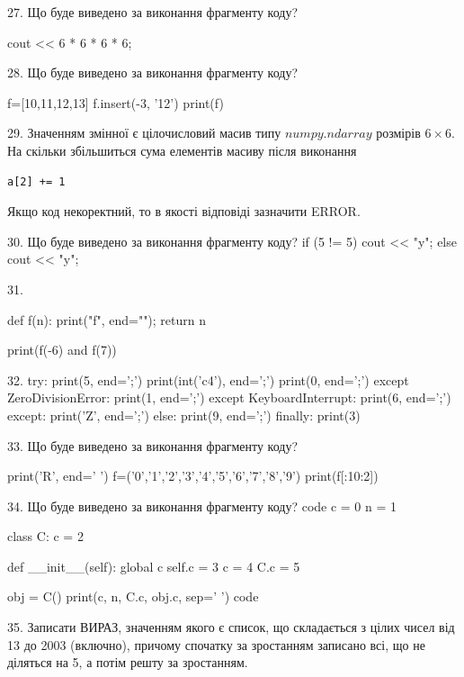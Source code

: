 \documentclass[11pt]{article}
\begin{document}
27. Що буде виведено за виконання фрагменту коду?

cout << 6 * 6 * 6 * 6;


28. Що буде виведено за виконання фрагменту коду?

f=[10,11,12,13]
f.insert(-3, '12')
print(f)



29. 
Значенням змінної  є цілочисловий масив типу $numpy.ndarray$ розмірів $6{\times}6$. На скільки збільшиться сума елементів масиву  після виконання
\begin{verbatim}
a[2] += 1
\end{verbatim}


Якщо код некоректний, то в якості відповіді зазначити ERROR.




30. Що буде виведено за виконання фрагменту коду?
if (5 != 5)
    cout << "y";
else
    cout << "y";



31. 

def f(n):
    print("f", end="");
    return n

print(f(-6) and f(7))


32. 
try:
    print(5, end=';')
    print(int('c4'), end=';')
    print(0, end=';')
except ZeroDivisionError:
    print(1, end=';')
except KeyboardInterrupt:
    print(6, end=';')
except:
    print('Z', end=';')
else:
    print(9, end=';')
finally:
    print(3)


33. Що буде виведено за виконання фрагменту коду?

print('R', end=' ')
f=('0','1','2','3','4','5','6','7','8','9')
print(f[:10:2])



34. Що буде виведено за виконання фрагменту коду?
code
c = 0
n = 1

class C:
    c = 2
    
    def __init__(self):
global c        self.c = 3
        c = 4
        C.c = 5

obj = C()
print(c, n, C.c, obj.c, sep=' ')
code


35. 
Записати ВИРАЗ, значенням якого є список, що складається з цілих чисел від 13 до 2003 (включно), причому спочатку за зростанням записано всі, що не діляться на 5, а потім решту за зростанням.
\end{document}

